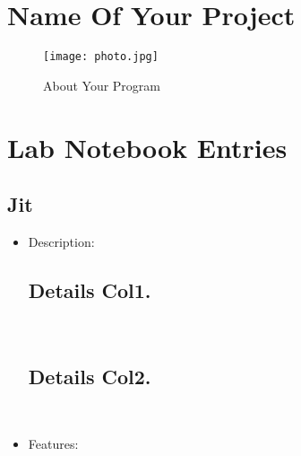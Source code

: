 \documentclass{article}
\begin{document}
\newpage
\section*{Name Of Your Project}
\begin{figure}[h!]
    \centering
\texttt{[image: photo.jpg]}
    \caption{About Your Program}
    \label{fig:image1}
\end{figure}

\newpage
\section*{Lab Notebook Entries}
\subsection*{Jit}
\begin{itemize}
    \subsection*{Program Name}


    \item Description: 
    
    \subsection*{Details Col1.}\\

    \subsection*{Details Col2.}\\

    \item Features: 
    \subsection*{}
    \subsection*{}
    \subsection*{}
    \subsection*{}


\end{itemize}
\end{document}
